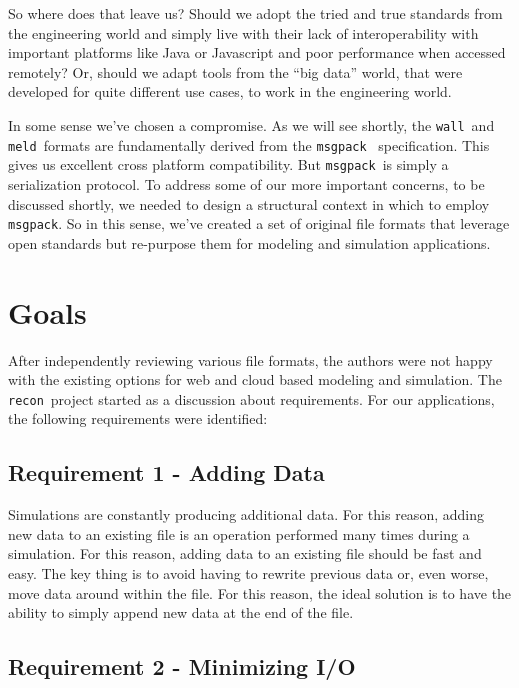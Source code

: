 \documentclass[11pt,a4paper,twocolumn]{article}
\newcommand{\recon}{\texttt{recon}}
\newcommand{\wall}{\texttt{wall}}
\newcommand{\meld}{\texttt{meld}}
\newcommand{\msgpack}{\texttt{msgpack}}
\begin{document}
So where does that leave us?  Should we adopt the tried and true
standards from the engineering world and simply live with their lack
of interoperability with important platforms like Java or Javascript
and poor performance when accessed remotely?  Or, should we adapt
tools from the ``big data'' world, that were developed for quite
different use cases, to work in the engineering world.

In some sense we've chosen a compromise.  As we will see shortly, the
\wall\ and \meld\ formats are fundamentally derived from the
\msgpack\ \cite{msgpack} specification.  This gives us excellent cross
platform compatibility.  But \msgpack\ is simply a serialization
protocol.  To address some of our more important concerns, to be
discussed shortly, we needed to design a structural context in which
to employ \msgpack. So in this sense, we've created a set of original
file formats that leverage open standards but re-purpose them for
modeling and simulation applications.

\section{Goals}
\label{sec:goals}

After independently reviewing various file formats, the authors were
not happy with the existing options for web and cloud based modeling
and simulation.  The \recon\ project started as a discussion about
requirements.  For our applications, the following requirements were
identified:

\subsection{Requirement 1 - Adding Data}


Simulations are constantly producing additional data.  For this
reason, adding new data to an existing file is an operation performed
many times during a simulation.  For this reason, adding data to an
existing file should be fast and easy.  The key thing is to avoid having to
rewrite previous data or, even worse, move data around within the
file.  For this reason, the ideal solution is to have the ability to
simply append new data at the end of the file.

\subsection{Requirement 2 - Minimizing I/O}
\end{document}
